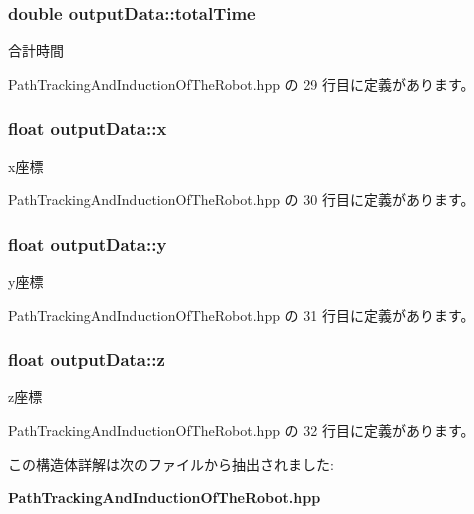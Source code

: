 \subsubsection[{total\-Time}]{\setlength{\rightskip}{0pt plus 5cm}double output\-Data\-::total\-Time}\label{structoutput_data_a79c4eabc287b3d1783b3d9d3c036a625}


合計時間 



 Path\-Tracking\-And\-Induction\-Of\-The\-Robot.\-hpp の 29 行目に定義があります。

\subsubsection[{x}]{\setlength{\rightskip}{0pt plus 5cm}float output\-Data\-::x}\label{structoutput_data_a6bbddab2722a262bf2c3f5b11cfab280}


x座標 



 Path\-Tracking\-And\-Induction\-Of\-The\-Robot.\-hpp の 30 行目に定義があります。

\subsubsection[{y}]{\setlength{\rightskip}{0pt plus 5cm}float output\-Data\-::y}\label{structoutput_data_a9b56dfa893983cda30d0e082f1a60757}


y座標 



 Path\-Tracking\-And\-Induction\-Of\-The\-Robot.\-hpp の 31 行目に定義があります。

\subsubsection[{z}]{\setlength{\rightskip}{0pt plus 5cm}float output\-Data\-::z}\label{structoutput_data_abca4e28577dd94f230bcff94199905e8}


z座標 



 Path\-Tracking\-And\-Induction\-Of\-The\-Robot.\-hpp の 32 行目に定義があります。



この構造体詳解は次のファイルから抽出されました\-:\begin{DoxyCompactItemize}
\item 
{\bf Path\-Tracking\-And\-Induction\-Of\-The\-Robot.\-hpp}\end{DoxyCompactItemize}
